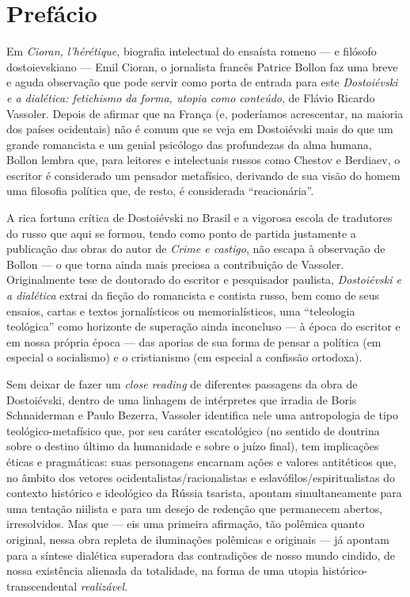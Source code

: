 \chapter*{Prefácio}



Em \emph{Cioran, l'hérétique}, biografia intelectual do ensaísta romeno
--- e filósofo dostoievskiano --- Emil Cioran, o jornalista francês
Patrice Bollon faz uma breve e aguda observação que pode servir como
porta de entrada para este \emph{Dostoiévski e a dialética: fetichismo
da forma, utopia como conteúdo}, de Flávio Ricardo Vassoler. Depois de
afirmar que na França (e, poderíamos acrescentar, na maioria dos países
ocidentais) não é comum que se veja em Dostoiévski mais do que um grande
romancista e um genial psicólogo das profundezas da alma humana, Bollon
lembra que, para leitores e intelectuais russos como Chestov e Berdiaev,
o escritor é considerado um pensador metafísico, derivando de sua visão
do homem uma filosofia política que, de resto, é considerada
``reacionária''.

A rica fortuna crítica de Dostoiévski no Brasil e a vigorosa escola de
tradutores do russo que aqui se formou, tendo como ponto de partida
justamente a publicação das obras do autor de \emph{Crime e castigo},
não escapa à observação de Bollon --- o que torna ainda mais preciosa a
contribuição de Vassoler. Originalmente tese de doutorado do escritor e
pesquisador paulista, \emph{Dostoiévski e a dialética} extrai da
ficção do romancista e contista russo, bem como de seus ensaios, cartas
e textos jornalísticos ou memorialísticos, uma ``teleologia teológica''
como horizonte de superação ainda inconcluso --- à época do escritor e em
nossa própria época --- das aporias de sua forma de pensar a política (em
especial o socialismo) e o cristianismo (em especial a confissão
ortodoxa).

Sem deixar de fazer um \emph{close reading} de diferentes passagens da
obra de Dostoiévski, dentro de uma linhagem de intérpretes que irradia
de Boris Schnaiderman e Paulo Bezerra, Vassoler identifica nele uma
antropologia de tipo teológico-metafísico que, por seu caráter
escatológico (no sentido de doutrina sobre o destino último da
humanidade e sobre o juízo final), tem implicações éticas e pragmáticas:
suas personagens encarnam ações e valores antitéticos que, no âmbito dos
vetores ocidentalistas/racionalistas e eslavófilos/espiritualistas do
contexto histórico e ideológico da Rússia tsarista, apontam
simultaneamente para uma tentação niilista e para um desejo de redenção
que permanecem abertos, irresolvidos. Mas que --- eis uma primeira
afirmação, tão polêmica quanto original, nessa obra repleta de
iluminações polêmicas e originais --- já apontam para a síntese dialética
superadora das contradições de nosso mundo cindido, de nossa existência
alienada da totalidade, na forma de uma utopia histórico-transcendental
\emph{realizável}.

